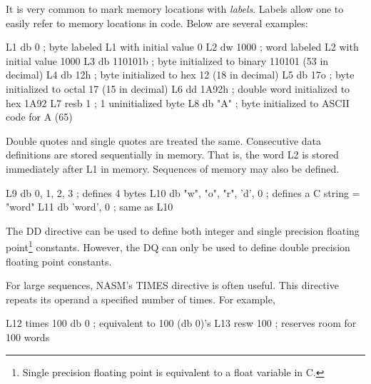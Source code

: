 It is very common to mark memory locations with
\emph{labels}.  Labels allow one to easily refer to
memory locations in code. Below are several examples:
\begin{AsmCodeListing}[frame=none, numbers=none]
L1    db     0        ; byte labeled L1 with initial value 0
L2    dw     1000     ; word labeled L2 with initial value 1000
L3    db     110101b  ; byte initialized to binary 110101 (53 in decimal)
L4    db     12h      ; byte initialized to hex 12 (18 in decimal)
L5    db     17o      ; byte initialized to octal 17 (15 in decimal)
L6    dd     1A92h    ; double word initialized to hex 1A92
L7    resb   1        ; 1 uninitialized byte
L8    db     "A"      ; byte initialized to ASCII code for A (65)
\end{AsmCodeListing}

Double quotes and single quotes are treated the same. Consecutive data
definitions are stored sequentially in memory. That is, the word L2 is
stored immediately after L1 in memory. Sequences of memory may also be
defined.
\begin{AsmCodeListing}[frame=none, numbers=none]
L9    db     0, 1, 2, 3              ; defines 4 bytes
L10   db     "w", "o", "r", 'd', 0   ; defines a C string = "word"
L11   db     'word', 0               ; same as L10
\end{AsmCodeListing}

The {\code DD} directive can be used to define
both integer and single precision floating point\footnote{Single
precision floating point is equivalent to a {\code float} variable in
C.} constants. However, the {\code DQ} can only
be used to define double precision floating point constants.

For large sequences, NASM's {\code TIMES} 
directive is often useful. This directive repeats its operand a
specified number of times. For example,
\begin{AsmCodeListing}[frame=none, numbers=none]
L12   times 100 db 0                 ; equivalent to 100 (db 0)'s
L13   resw   100                     ; reserves room for 100 words
\end{AsmCodeListing}

